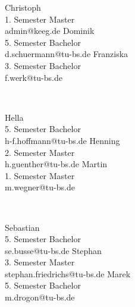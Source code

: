 {Christoph\\ 1. Semester Master\\ admin@keeg.de}
\hfill
{}
{Dominik\\5. Semester Bachelor\\ d.schuermann@tu-bs.de}
\hfill
{}
{Franziska\\3. Semester Bachelor\\ f.werk@tu-bs.de}
\par \ \par
{}
{Hella\\ 5. Semester Bachelor\\ h-f.hoffmann@tu-bs.de}
\hfill
{}
{Henning\\ 2. Semester Master\\ h.guenther@tu-bs.de}
\hfill
{}
{Martin\\ 1. Semester Master\\ m.wegner@tu-bs.de}
\par \ \par
{}
{Sebastian\\ 5. Semester Bachelor\\ se.busse@tu-bs.de}
\hfill
{}
{Stephan\\ 3. Semester Master\\ stephan.friedrichs@tu-bs.de}
\hfill
{}
{Marek\\ 5. Semester Bachelor\\ m.drogon@tu-bs.de}



\twocolumn

